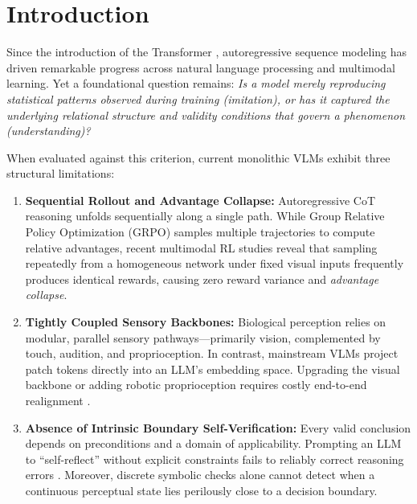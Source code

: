 \documentclass[10pt,twocolumn]{article}
\begin{document}
\section{Introduction}
Since the introduction of the Transformer \cite{vaswani2017attention}, autoregressive sequence modeling has driven remarkable progress across natural language processing and multimodal learning. Yet a foundational question remains: \emph{Is a model merely reproducing statistical patterns observed during training (imitation), or has it captured the underlying relational structure and validity conditions that govern a phenomenon (understanding)?}

When evaluated against this criterion, current monolithic VLMs exhibit three structural limitations:
\begin{enumerate}
    \item \textbf{Sequential Rollout and Advantage Collapse:} Autoregressive CoT reasoning unfolds sequentially along a single path. While Group Relative Policy Optimization (GRPO) \cite{shao2024deepseekmath,guo2025deepseekr1} samples multiple trajectories to compute relative advantages, recent multimodal RL studies \cite{leng2026mmr1,liu2026mssr,dualgroup2026} reveal that sampling repeatedly from a homogeneous network under fixed visual inputs frequently produces identical rewards, causing zero reward variance and \emph{advantage collapse}.
    \item \textbf{Tightly Coupled Sensory Backbones:} Biological perception relies on modular, parallel sensory pathways—primarily vision, complemented by touch, audition, and proprioception. In contrast, mainstream VLMs project patch tokens directly into an LLM's embedding space. Upgrading the visual backbone or adding robotic proprioception requires costly end-to-end realignment \cite{rapid2025}.
    \item \textbf{Absence of Intrinsic Boundary Self-Verification:} Every valid conclusion depends on preconditions and a domain of applicability. Prompting an LLM to ``self-reflect'' without explicit constraints fails to reliably correct reasoning errors \cite{wu2024proco}. Moreover, discrete symbolic checks alone cannot detect when a continuous perceptual state lies perilously close to a decision boundary.
\end{enumerate}
\end{document}
